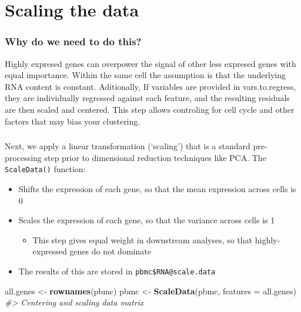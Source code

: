 \documentclass[
]{book}
\newenvironment{Shaded}{\begin{snugshade}}{\end{snugshade}}
\newcommand{\AttributeTok}[1]{\textcolor[rgb]{0.13,0.29,0.53}{#1}}
\newcommand{\CommentTok}[1]{\textcolor[rgb]{0.56,0.35,0.01}{\textit{#1}}}
\newcommand{\FunctionTok}[1]{\textcolor[rgb]{0.13,0.29,0.53}{\textbf{#1}}}
\newcommand{\NormalTok}[1]{#1}
\newcommand{\OtherTok}[1]{\textcolor[rgb]{0.56,0.35,0.01}{#1}}
\providecommand{\tightlist}{%
  \setlength{\itemsep}{0pt}\setlength{\parskip}{0pt}}
\begin{document}
\hypertarget{scaling-the-data}{%
\section{Scaling the data}\label{scaling-the-data}}

\hypertarget{why-do-we-need-to-do-this-3}{%
\subsubsection*{Why do we need to do this?}\label{why-do-we-need-to-do-this-3}}

Highly expresed genes can overpower the signal of other less expresed genes with equal importance. Within the same cell the assumption is that the underlying RNA content is constant. Aditionally, If variables are provided in vars.to.regress, they are individually regressed against each feature, and the resulting residuals are then scaled and centered.
This step allows controling for cell cycle and other factors that may bias your clustering.

\hypertarget{section-5}{%
\subsubsection*{}\label{section-5}}

Next, we apply a linear transformation (`scaling') that is a standard pre-processing step prior to dimensional reduction techniques like PCA. The \texttt{ScaleData()} function:

\begin{itemize}
\tightlist
\item
  Shifts the expression of each gene, so that the mean expression across cells is 0
\item
  Scales the expression of each gene, so that the variance across cells is 1

  \begin{itemize}
  \tightlist
  \item
    This step gives equal weight in downstream analyses, so that highly-expressed genes do not dominate
  \end{itemize}
\item
  The results of this are stored in \texttt{pbmc\$RNA@scale.data}
\end{itemize}

\begin{Shaded}
\begin{Highlighting}[]
\NormalTok{all.genes }\OtherTok{\textless{}{-}} \FunctionTok{rownames}\NormalTok{(pbmc)}
\NormalTok{pbmc }\OtherTok{\textless{}{-}} \FunctionTok{ScaleData}\NormalTok{(pbmc, }\AttributeTok{features =}\NormalTok{ all.genes)}
\CommentTok{\#\textgreater{} Centering and scaling data matrix}
\end{Highlighting}
\end{Shaded}
\end{document}
